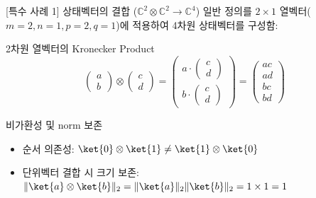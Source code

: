 \documentclass[aspectratio=169, 10pt]{beamer}
\begin{document}
\begin{frame}{[특수 사례 1] 상태벡터의 결합 ($\mathbb{C}^2 \otimes \mathbb{C}^2 \to \mathbb{C}^4$)}
    일반 정의를 $2 \times 1$ 열벡터($m=2, n=1, p=2, q=1$)에 적용하여 4차원 상태벡터를 구성함:
    \vspace{0.15cm}
    \begin{qcblock}{2차원 열벡터의 Kronecker Product}
        $$\begin{pmatrix} a \\ b \end{pmatrix} \otimes \begin{pmatrix} c \\ d \end{pmatrix} = \begin{pmatrix} a \cdot \begin{pmatrix} c \\ d \end{pmatrix} \\ b \cdot \begin{pmatrix} c \\ d \end{pmatrix} \end{pmatrix} = \begin{pmatrix} ac \\ ad \\ bc \\ bd \end{pmatrix}$$
    \end{qcblock}
    \pause
    \vspace{0.15cm}
    \begin{qctip}{비가환성 및 norm 보존}
        \begin{itemize}
            \item 순서 의존성: $\ket{0}\otimes\ket{1} \neq \ket{1}\otimes\ket{0}$
            \pause
            \item 단위벡터 결합 시 크기 보존: $\|\ket{a}\otimes\ket{b}\|_2 = \|\ket{a}\|_2 \|\ket{b}\|_2 = 1 \times 1 = 1$
        \end{itemize}
    \end{qctip}
\end{frame}
\end{document}
